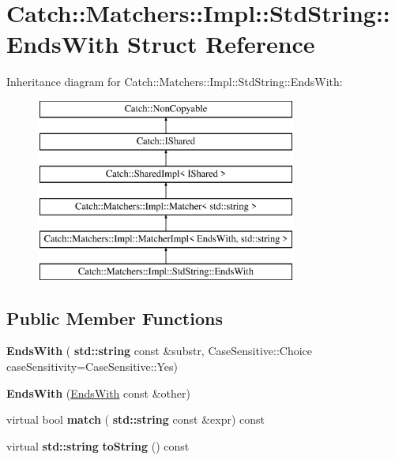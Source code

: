 \hypertarget{struct_catch_1_1_matchers_1_1_impl_1_1_std_string_1_1_ends_with}{}\section{Catch\+:\+:Matchers\+:\+:Impl\+:\+:Std\+String\+:\+:Ends\+With Struct Reference}
\label{struct_catch_1_1_matchers_1_1_impl_1_1_std_string_1_1_ends_with}
Inheritance diagram for Catch\+:\+:Matchers\+:\+:Impl\+:\+:Std\+String\+:\+:Ends\+With\+:\begin{figure}[H]
\begin{center}
\leavevmode
\includegraphics[height=6.000000cm]{struct_catch_1_1_matchers_1_1_impl_1_1_std_string_1_1_ends_with}
\end{center}
\end{figure}
\subsection*{Public Member Functions}
\begin{DoxyCompactItemize}
\item 
\mbox{\label{struct_catch_1_1_matchers_1_1_impl_1_1_std_string_1_1_ends_with_ae90c02ff06c9dd5e62218b2b521e8cab}} 
{\bfseries Ends\+With} (\textbf{ std\+::string} const \&substr, Case\+Sensitive\+::\+Choice case\+Sensitivity=Case\+Sensitive\+::\+Yes)
\item 
\mbox{\label{struct_catch_1_1_matchers_1_1_impl_1_1_std_string_1_1_ends_with_a9321aac07fb17613a7993e99003b3be2}} 
{\bfseries Ends\+With} (\hyperlink{struct_catch_1_1_matchers_1_1_impl_1_1_std_string_1_1_ends_with}{Ends\+With} const \&other)
\item 
\mbox{\label{struct_catch_1_1_matchers_1_1_impl_1_1_std_string_1_1_ends_with_aff66fb5af2d4f6161627cb20899b2c1b}} 
virtual bool {\bfseries match} (\textbf{ std\+::string} const \&expr) const
\item 
\mbox{\label{struct_catch_1_1_matchers_1_1_impl_1_1_std_string_1_1_ends_with_a2a4675e3d2369d587af36f051fb7964f}} 
virtual \textbf{ std\+::string} {\bfseries to\+String} () const
\end{DoxyCompactItemize}
